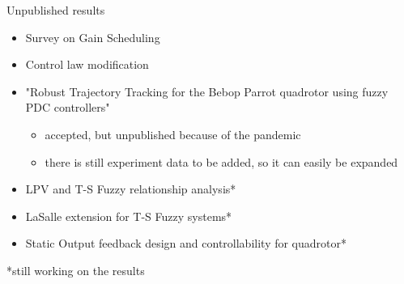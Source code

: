 \begin{frame}{Unpublished results}
	\begin{itemize}
		\item Survey on Gain Scheduling
		
		\item Control law modification
		
		\item "Robust Trajectory Tracking for the Bebop Parrot quadrotor using fuzzy
PDC controllers" 
\begin{itemize}
    \item accepted, but unpublished because of the pandemic
    \item there is still experiment data to be added, so it can easily be expanded
\end{itemize}
		\item LPV and T-S Fuzzy relationship analysis*
		
		\item LaSalle extension for T-S Fuzzy systems*
		
		\item Static Output feedback design and controllability for quadrotor*
	\end{itemize}
	\vspace{2cm}
	*still working on the results
\end{frame}

